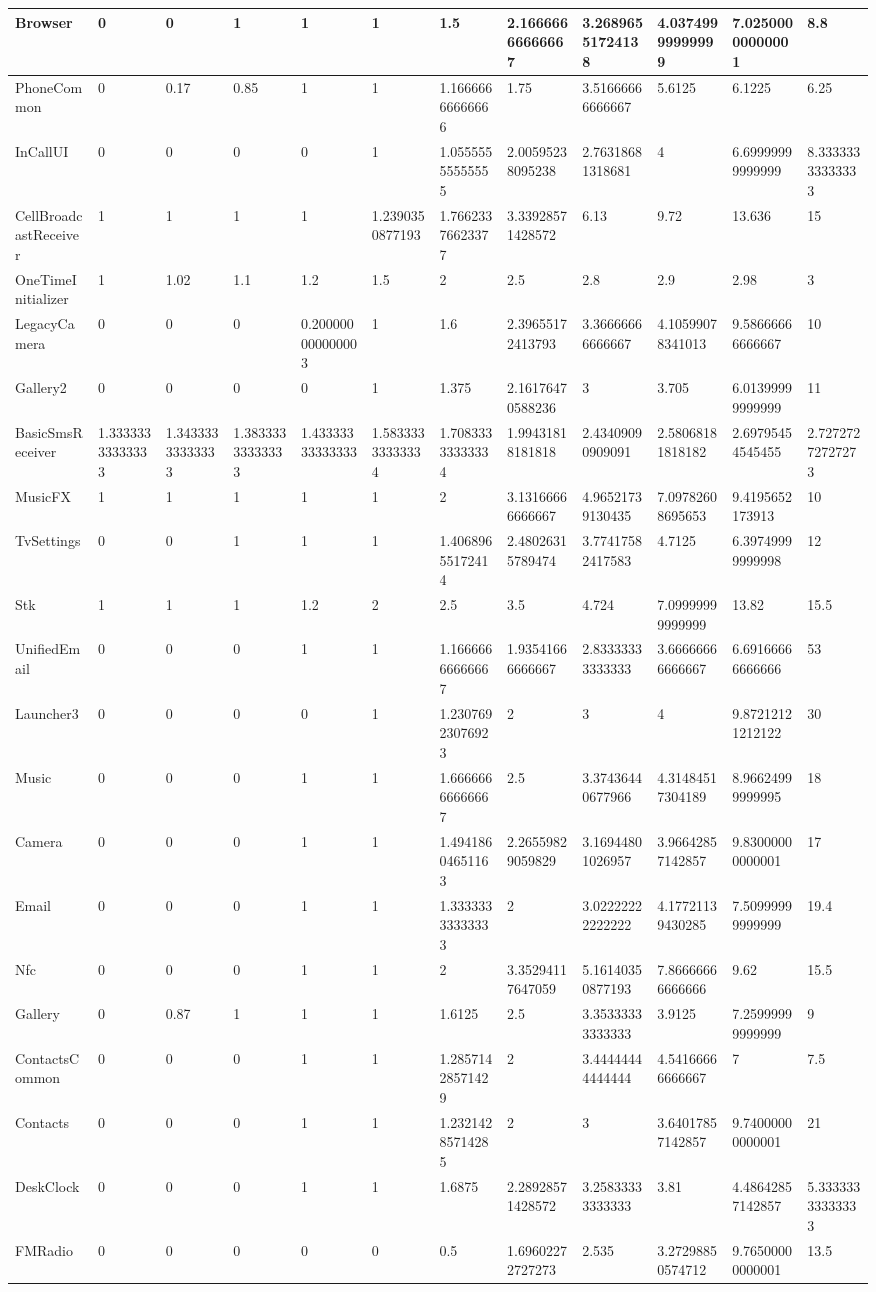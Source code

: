 \documentclass[a4paper]{article}
\begin{document}
\begin{tabular}{|l|l|l|l|l|l|l|l|l|l|l|l|}
\hline
Browser&0&0&1&1&1&1.5&2.16666666666667&3.26896551724138&4.03749999999999&7.02500000000001&8.8\\
\hline
PhoneCommon&0&0.17&0.85&1&1&1.16666666666666&1.75&3.51666666666667&5.6125&6.1225&6.25\\
\hline
InCallUI&0&0&0&0&1&1.05555555555555&2.00595238095238&2.76318681318681&4&6.69999999999999&8.33333333333333\\
\hline
CellBroadcastReceiver&1&1&1&1&1.2390350877193&1.76623376623377&3.33928571428572&6.13&9.72&13.636&15\\
\hline
OneTimeInitializer&1&1.02&1.1&1.2&1.5&2&2.5&2.8&2.9&2.98&3\\
\hline
LegacyCamera&0&0&0&0.200000000000003&1&1.6&2.39655172413793&3.36666666666667&4.10599078341013&9.58666666666667&10\\
\hline
Gallery2&0&0&0&0&1&1.375&2.16176470588236&3&3.705&6.01399999999999&11\\
\hline
BasicSmsReceiver&1.33333333333333&1.34333333333333&1.38333333333333&1.43333333333333&1.58333333333334&1.70833333333334&1.99431818181818&2.43409090909091&2.58068181818182&2.69795454545455&2.72727272727273\\
\hline
MusicFX&1&1&1&1&1&2&3.13166666666667&4.96521739130435&7.09782608695653&9.4195652173913&10\\
\hline
TvSettings&0&0&1&1&1&1.40689655172414&2.48026315789474&3.77417582417583&4.7125&6.39749999999998&12\\
\hline
Stk&1&1&1&1.2&2&2.5&3.5&4.724&7.09999999999999&13.82&15.5\\
\hline
UnifiedEmail&0&0&0&1&1&1.16666666666667&1.93541666666667&2.83333333333333&3.66666666666667&6.69166666666666&53\\
\hline
Launcher3&0&0&0&0&1&1.23076923076923&2&3&4&9.87212121212122&30\\
\hline
Music&0&0&0&1&1&1.66666666666667&2.5&3.37436440677966&4.31484517304189&8.96624999999995&18\\
\hline
Camera&0&0&0&1&1&1.49418604651163&2.26559829059829&3.16944801026957&3.96642857142857&9.83000000000001&17\\
\hline
Email&0&0&0&1&1&1.33333333333333&2&3.02222222222222&4.17721139430285&7.50999999999999&19.4\\
\hline
Nfc&0&0&0&1&1&2&3.35294117647059&5.16140350877193&7.86666666666666&9.62&15.5\\
\hline
Gallery&0&0.87&1&1&1&1.6125&2.5&3.35333333333333&3.9125&7.25999999999999&9\\
\hline
ContactsCommon&0&0&0&1&1&1.28571428571429&2&3.44444444444444&4.54166666666667&7&7.5\\
\hline
Contacts&0&0&0&1&1&1.23214285714285&2&3&3.64017857142857&9.74000000000001&21\\
\hline
DeskClock&0&0&0&1&1&1.6875&2.28928571428572&3.25833333333333&3.81&4.48642857142857&5.33333333333333\\
\hline
FMRadio&0&0&0&0&0&0.5&1.69602272727273&2.535&3.27298850574712&9.76500000000001&13.5\\
\hline
\end{tabular}
\end{document}
